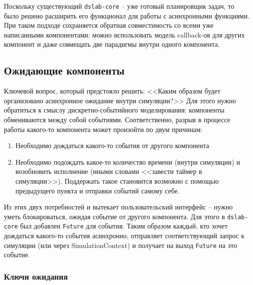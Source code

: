 Поскольку существующий \texttt{dslab-core} -- уже готовый планировщик задач, то было решено расширить его функционал для работы с асинхронными функциями. При таком подходе сохраняется обратная совместимость со всеми уже написанными компонентами: можно использовать модель callback-ов для других компонент и даже совмещать две парадигмы внутри одного компонента. 

\subsection{Ожидающие компоненты}

Ключевой вопрос, который предстояло решить: <<Каким образом будет организовано асинхронное ожидание внутри симуляции?>> Для этого нужно обратиться к смыслу дискретно-событийного моделирования: компоненты обмениваются между собой событиями. Соответственно, разрыв в процессе работы какого-то компонента может произойти по двум причинам:
\begin{enumerate}
    \item Необходимо дождаться какого-то события от другого компонента 
    \item Необходимо подождать какое-то количество времени (внутри симуляции) и возобновить исполнение (иными словами <<завести таймер в симуляции>>). Поддержать такое становится возможно с помощью предыдущего пункта и отправки событий самому себе. 
\end{enumerate}

Из этих двух потребностей и вытекает пользовательский интерфейс -- нужно уметь блокироваться, ожидая событие от другого компонента. Для этого в \texttt{dslab-core} был добавлен \texttt{Future} для события. Таким образом каждый, кто хочет дождаться какого-то события асинхронно, отправляет соответствующий запрос к симуляции (или через SimulationContext) и получает на выход \texttt{Future} на это событие. 

\subsubsection{Ключи ожидания} \label{awaitkey}

